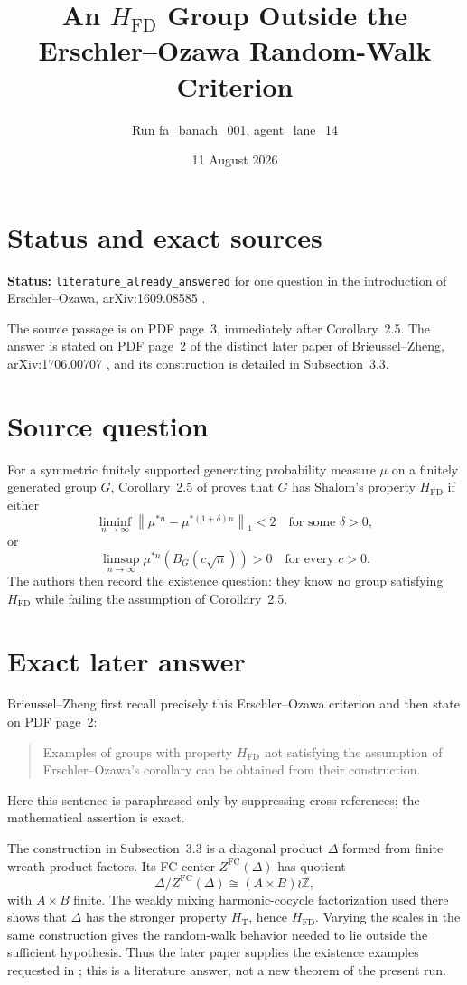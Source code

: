 \documentclass[11pt]{article}
\title{An $H_{\mathrm{FD}}$ Group Outside the\\
Erschler--Ozawa Random-Walk Criterion}
\author{Run fa\_banach\_001, agent\_lane\_14}
\date{11 August 2026}
\begin{document}
\maketitle

\section*{Status and exact sources}

\textbf{Status:} \texttt{literature\_already\_answered} for one question in
the introduction of Erschler--Ozawa, arXiv:1609.08585 \cite{EO}.

The source passage is on PDF page~3, immediately after Corollary~2.5.  The
answer is stated on PDF page~2 of the distinct later paper of
Brieussel--Zheng, arXiv:1706.00707 \cite{BZ}, and its construction is detailed
in Subsection~3.3.

\section*{Source question}

For a symmetric finitely supported generating probability measure $\mu$ on a
finitely generated group $G$, Corollary~2.5 of \cite{EO} proves that $G$ has
Shalom's property $H_{\mathrm{FD}}$ if either
\[
 \liminf_{n\to\infty}
 \left\|\mu^{*n}-\mu^{*(1+\delta)n}\right\|_1<2
 \quad\text{for some }\delta>0,
\]
or
\[
 \limsup_{n\to\infty}\mu^{*n}\!\left(B_G(c\sqrt n)\right)>0
 \quad\text{for every }c>0.
\]
The authors then record the existence question: they know no group satisfying
$H_{\mathrm{FD}}$ while failing the assumption of Corollary~2.5.

\section*{Exact later answer}

Brieussel--Zheng first recall precisely this Erschler--Ozawa criterion and
then state on PDF page~2:
\begin{quote}
Examples of groups with property $H_{\mathrm{FD}}$ not satisfying the
assumption of Erschler--Ozawa's corollary can be obtained from their
construction.
\end{quote}
Here this sentence is paraphrased only by suppressing cross-references; the
mathematical assertion is exact.

The construction in Subsection~3.3 is a diagonal product $\Delta$ formed from
finite wreath-product factors.  Its FC-center $Z^{\mathrm{FC}}(\Delta)$ has
quotient
\[
 \Delta/Z^{\mathrm{FC}}(\Delta)
 \cong (A\times B)\wr\mathbb Z,
\]
with $A\times B$ finite.  The weakly mixing harmonic-cocycle factorization
used there shows that $\Delta$ has the stronger property $H_{\mathrm T}$,
hence $H_{\mathrm{FD}}$.  Varying the scales in the same construction gives
the random-walk behavior needed to lie outside the sufficient hypothesis.
Thus the later paper supplies the existence examples requested in \cite{EO};
this is a literature answer, not a new theorem of the present run.
\end{document}
